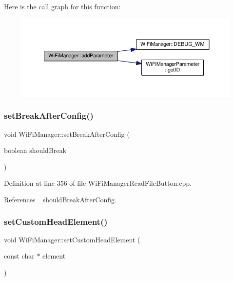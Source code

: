Here is the call graph for this function\+:\nopagebreak
\begin{figure}[H]
\begin{center}
\leavevmode
\includegraphics[width=350pt]{d4/dc8/class_wi_fi_manager_a62907428e5874de097d83c33ef46c80d_cgraph}
\end{center}
\end{figure}
\mbox{\label{class_wi_fi_manager_ad48fd74c893d12778121fa239d245cc9}} 
\subsubsection{\texorpdfstring{set\+Break\+After\+Config()}{setBreakAfterConfig()}}
{\footnotesize\ttfamily void Wi\+Fi\+Manager\+::set\+Break\+After\+Config (\begin{DoxyParamCaption}\item[{boolean}]{should\+Break }\end{DoxyParamCaption})}



Definition at line 356 of file Wi\+Fi\+Manager\+Read\+File\+Button.\+cpp.



References \+\_\+should\+Break\+After\+Config.

\mbox{\label{class_wi_fi_manager_a85570bcfe03da48c4be75b8e4302c4db}} 
\subsubsection{\texorpdfstring{set\+Custom\+Head\+Element()}{setCustomHeadElement()}}
{\footnotesize\ttfamily void Wi\+Fi\+Manager\+::set\+Custom\+Head\+Element (\begin{DoxyParamCaption}\item[{const char $\ast$}]{element }\end{DoxyParamCaption})}



